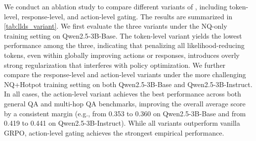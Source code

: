 We conduct an ablation study to compare different variants of \ours{}, including token-level, response-level, and action-level gating. The results are summarized in \cref{tab:llds_variant}. We first evaluate the three variants under the NQ-only training setting on Qwen2.5-3B-Base. The token-level variant yields the lowest performance among the three, indicating that penalizing all likelihood-reducing tokens, even within globally improving actions or responses, introduces overly strong regularization that interferes with policy optimization. We further compare the response-level and action-level variants under the more challenging NQ+Hotpot training setting on both Qwen2.5-3B-Base and Qwen2.5-3B-Instruct. In all cases, the action-level variant achieves the best performance across both general QA and multi-hop QA benchmarks, improving the overall average score by a consistent margin (e.g., from 0.353 to 0.360 on Qwen2.5-3B-Base and from 0.419 to 0.441 on Qwen2.5-3B-Instruct). While all variants outperform vanilla GRPO, action-level gating achieves the strongest empirical performance.




